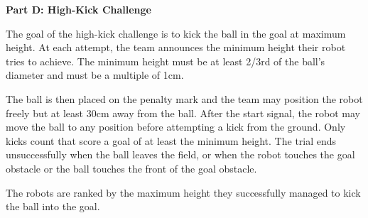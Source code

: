 \clearpage
\sffamily
{\bfseries\color[rgb]{0.4,0.4,0.4} Part D: High-Kick Challenge}
{}


\bigskip

The goal of the high-kick challenge is to kick the ball in the goal at maximum height.
At each attempt, the team announces the minimum height their robot tries to achieve.
The minimum height must be at least 2/3rd of the ball's diameter and must be a
multiple of 1cm.

The ball is then placed on the penalty mark and the team may position the robot
freely but at least 30cm away from the ball.
After the start signal, the robot may move the ball to any position before
attempting a kick from the ground.
Only kicks count that score a goal of at least the minimum height.
The trial ends unsuccessfully when the ball leaves the field, or when the robot
touches the goal obstacle or the ball touches the front of the goal obstacle.

The robots are ranked by the maximum height they successfully managed to kick
the ball into the goal.
